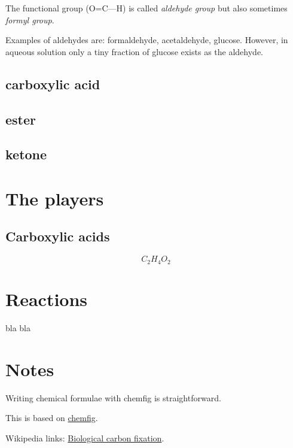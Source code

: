 \documentclass{article}
\begin{document}

The functional group (O=C---H) is called {\em aldehyde group\/} but also sometimes {\em
formyl group}.

Examples of aldehydes are: formaldehyde, acetaldehyde, glucose. However, in aqueous
solution only a tiny fraction of glucose exists as the aldehyde.

\subsection{carboxylic acid}

\subsection{ester}

\subsection{ketone}


\section{The players}\label{sec_players}

\subsection{Carboxylic acids}
\[
C_2H_4O_2
\]


\section{Reactions}\label{sec_reactions}

bla bla


\section{Notes}\label{sec_notes}

Writing chemical formulae with chemfig is straightforward.

This is based on \href{https://www.overleaf.com/learn/latex/Chemistry_formulae}{chemfig}.

Wikipedia links:
\href{https://en.wikipedia.org/wiki/Biological_carbon_fixation}{Biological carbon fixation}.
\end{document}
